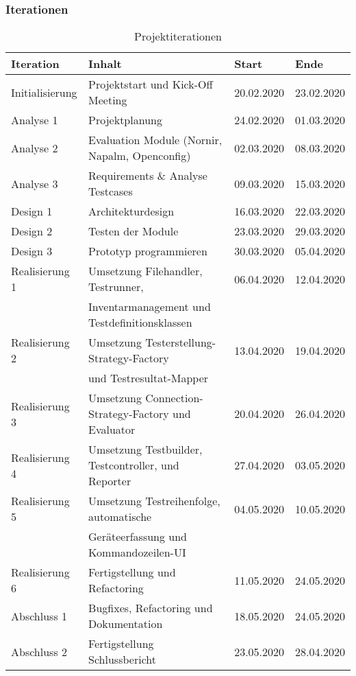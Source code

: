 \documentclass[]{subfiles}
\begin{document}
    \subsubsection{Iterationen}
    \begin{table}[!h]
        \begin{tabularx}{\textwidth}{lXll}
            \toprule
            Iteration & Inhalt & Start & Ende \\
            \midrule
            Initialisierung & Projektstart und Kick-Off Meeting & 20.02.2020 & 23.02.2020 \\
            \midrule
            Analyse 1 & Projektplanung & 24.02.2020 & 01.03.2020 \\
            Analyse 2 & Evaluation Module (Nornir, Napalm, Openconfig) & 02.03.2020 & 08.03.2020 \\
            Analyse 3 & Requirements \& Analyse Testcases & 09.03.2020 & 15.03.2020 \\
            \midrule
            Design 1 & Architekturdesign & 16.03.2020 & 22.03.2020 \\
            Design 2 & Testen der Module & 23.03.2020 & 29.03.2020 \\
            Design 3 & Prototyp programmieren & 30.03.2020 & 05.04.2020 \\
            \midrule
            Realisierung 1 & Umsetzung Filehandler, Testrunner,  & 06.04.2020 & 12.04.2020 \\
             & Inventarmanagement und Testdefinitionsklassen & & \\
            Realisierung 2 & Umsetzung Testerstellung-Strategy-Factory & 13.04.2020 & 19.04.2020 \\
             & und Testresultat-Mapper & & \\
            Realisierung 3 & Umsetzung Connection-Strategy-Factory und Evaluator & 20.04.2020 & 26.04.2020 \\
            Realisierung 4 & Umsetzung Testbuilder, Testcontroller, und Reporter & 27.04.2020 & 03.05.2020 \\
            Realisierung 5 & Umsetzung Testreihenfolge, automatische  & 04.05.2020 & 10.05.2020 \\
             & Geräteerfassung und Kommandozeilen-UI & & \\
            Realisierung 6 & Fertigstellung und Refactoring & 11.05.2020 & 24.05.2020 \\
            \midrule
            Abschluss 1 & Bugfixes, Refactoring und Dokumentation & 18.05.2020 & 24.05.2020\\
            Abschluss 2 & Fertigstellung Schlussbericht & 23.05.2020 & 28.04.2020\\
            \bottomrule
        \end{tabularx}
        \caption{Projektiterationen}
    \end{table}
\end{document}
